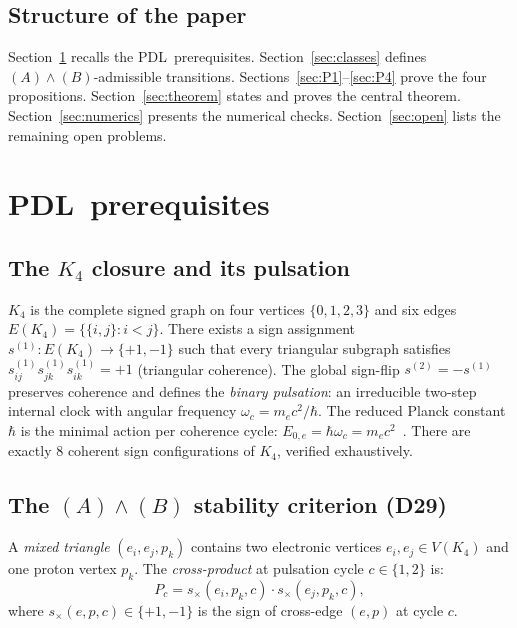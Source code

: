 \documentclass[11pt,a4paper]{article}
\theoremstyle{definition}
\newcommand{\PDL}{\textnormal{PDL}}
\newcommand{\hb}{\hbar}
\begin{document}
\subsection{Structure of the paper}

Section~\ref{sec:prereq} recalls the \PDL\ prerequisites. Section~\ref{sec:classes} defines $(A)\wedge(B)$-admissible transitions. Sections~\ref{sec:P1}--\ref{sec:P4} prove the four propositions. Section~\ref{sec:theorem} states and proves the central theorem. Section~\ref{sec:numerics} presents the numerical checks. Section~\ref{sec:open} lists the remaining open problems.

\section{\PDL\ prerequisites}
\label{sec:prereq}

\subsection{The \texorpdfstring{$K_4$}{K4} closure and its pulsation}

$K_4$ is the complete signed graph on four vertices $\{0,1,2,3\}$ and six edges $E(K_4) = \{\{i,j\} : i < j\}$. There exists a sign assignment $s^{(1)} : E(K_4)\to\{+1,-1\}$ such that every triangular subgraph satisfies $s^{(1)}_{ij}s^{(1)}_{jk}s^{(1)}_{ik} = +1$ (triangular coherence). The global sign-flip $s^{(2)} = -s^{(1)}$ preserves coherence and defines the \emph{binary pulsation}: an irreducible two-step internal clock with angular frequency $\omega_c = m_e c^2/\hb$. The reduced Planck constant $\hb$ is the minimal action per coherence cycle: $E_{0,e} = \hb\omega_c = m_e c^2$~\cite{PDL_Main_2026}. There are exactly 8 coherent sign configurations of $K_4$, verified exhaustively.

\subsection{The \texorpdfstring{$(A)\wedge(B)$}{(A)∧(B)} stability criterion (D29)}

A \emph{mixed triangle} $(e_i,e_j,p_k)$ contains two electronic vertices $e_i,e_j\in V(K_4)$ and one proton vertex $p_k$. The \emph{cross-product} at pulsation cycle $c\in\{1,2\}$ is:
\begin{equation}
P_c = s_\times(e_i,p_k,c)\cdot s_\times(e_j,p_k,c),
\label{eq:Pc}
\end{equation}
where $s_\times(e,p,c)\in\{+1,-1\}$ is the sign of cross-edge $(e,p)$ at cycle $c$.
\end{document}
